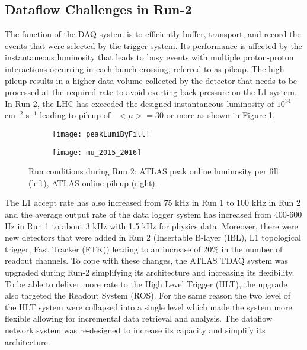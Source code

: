 \subsection{Dataflow Challenges in Run-2}
The function of the DAQ system is to efficiently buffer, transport, and record the events that were selected by the trigger system. 
Its performance is affected by the instantaneous luminosity that leads to busy events with multiple proton-proton interactions occurring in each 
bunch crossing, referred to as pileup. The high pileup results in a higher data volume collected by the detector that needs to be 
processed at the required rate to avoid exerting back-pressure on the L1 system. 
In Run 2, the LHC has exceeded the designed instantaneous luminosity of $10^{34}$ cm$^{-2}$ s$^{-1}$ leading to pileup of~ $<\mu>=30$ or more as shown 
in Figure \ref{fig:lumi_pileup_1}.
\begin{figure}[t!]
\centering
\begin{subfigure}[t]{0.48\textwidth}
\texttt{[image: peakLumiByFill]}
\end{subfigure}
\begin{subfigure}[t]{0.48\textwidth}
\texttt{[image: mu\_2015\_2016]}
\end{subfigure}
\caption{Run conditions during Run 2: ATLAS peak online luminosity per fill (left), ATLAS online pileup (right) \cite{atlasTwiki}.}
\label{fig:lumi_pileup_1}
\end{figure} 
The L1 accept 
rate has also increased from 75 kHz in Run 1 to 100 kHz in Run 2 and the average output rate of the data logger system has 
increased from 400-600 Hz in Run 1 to about 3 kHz with 1.5 kHz for physics data. 
Moreover, there were new detectors that were added in Run 2
(Insertable B-layer (IBL), L1 topological trigger, Fast Tracker (FTK))\cite{Aad:1602235} leading to 
an increase of 20\% in the number of readout channels. 
To cope with these changes, the ATLAS TDAQ system was upgraded during Run-2
simplifying its architecture and increasing its flexibility.
To be able to deliver more rate to the High Level Trigger (HLT), the upgrade also targeted the Readout System (ROS)\cite{PanduroVazquez2016939}. 
For the same reason the two level of the HLT system were collapsed into a single level which made the system more flexible 
 allowing for incremental data retrieval and analysis. 
The dataflow network system was re-designed to increase its capacity and simplify its architecture\cite{1742-6596-396-1-012033}.


